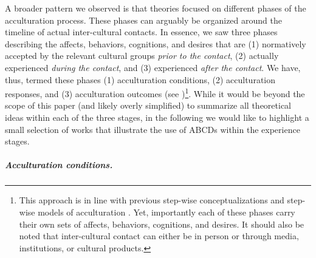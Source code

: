 A broader pattern we observed is that theories focused on different
phases of the acculturation process. These phases can arguably be
organized around the timeline of actual inter-cultural contacts. In
essence, we saw three phases describing the affects, behaviors,
cognitions, and desires that are (1) normatively accepted by the
relevant cultural groups \textit{prior to the contact}, (2) actually
experienced \textit{during the contact}, and (3) experienced
\textit{after the contact}. We have, thus, termed these phases (1)
acculturation conditions, (2) acculturation responses, and (3)
acculturation outcomes (see
)\footnote{This approach is in line with previous step-wise conceptualizations \citep[e.g., process vs. outcome distinction;][]{Sam2006b} and step-wise models of acculturation \citep[e.g.,][]{Arends-Toth2006a, TeLindert2008a}. Yet, importantly each of these phases carry their own sets of affects, behaviors, cognitions, and desires. It should also be noted that inter-cultural contact can either be in person or through media, institutions, or cultural products.}.
While it would be beyond the scope of this paper (and likely overly
simplified) to summarize all theoretical ideas within each of the three
stages, in the following we would like to highlight a small selection of
works that illustrate the use of ABCDs within the experience stages.

\subparagraph{Acculturation conditions.}

